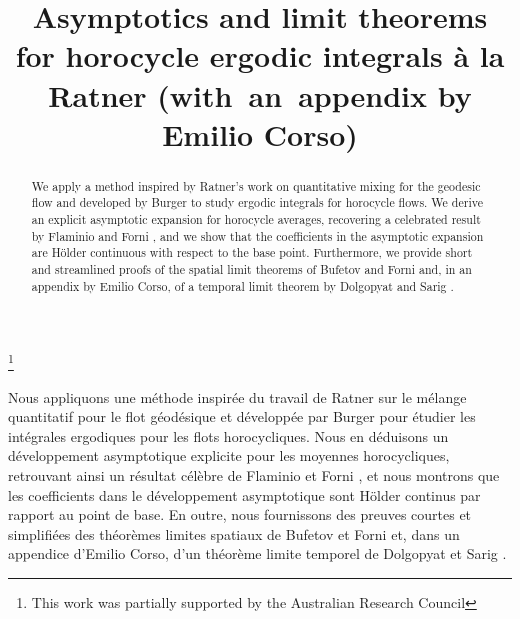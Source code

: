 \documentclass[JEP,XML,SOM,NoEqCountersInSection,Unicode,published]{cedram}
\theoremstyle{definition}
\begin{document}
\title[Asymptotics and limit theorems for horocycle integrals]
{Asymptotics and limit theorems for horocycle ergodic integrals à la Ratner (with~an~appendix by Emilio Corso)}

\author[\initial{D.} \lastname{Ravotti}]{ }
\address{Monash University, School of Mathematics
\\ Clayton Campus, 3800 Victoria, Australia}

\thanks{This work was partially supported by the Australian Research Council}

\begin{abstract}
We apply a method inspired by Ratner's work on quantitative mixing for the \hbox{geodesic} flow \cite{Rat1} and developed by Burger \cite{Bur} to study ergodic integrals for horocycle flows. We derive an explicit asymptotic expansion for horocycle averages, recovering a celebrated result by Flaminio and Forni \cite{FlaFo}, and we show that the coefficients in the asymptotic expansion are Hölder continuous with respect to the base point. Furthermore, we provide short and streamlined proofs of the spatial limit theorems of Bufetov and Forni \cite{BuFo} and, in an appendix by Emilio Corso, of a temporal limit theorem by Dolgopyat and Sarig \cite{Dolgopyat-Sarig}.
\end{abstract}





\begin{altabstract}
Nous appliquons une méthode inspirée du travail de Ratner sur le mélange quantitatif pour le flot géodésique \cite{Rat1} et développée par Burger \cite{Bur} pour étudier les intégrales ergodiques pour les flots horocycliques. Nous en déduisons un développement asymptotique explicite pour les moyennes horocycliques, retrouvant ainsi un résultat célèbre de Flaminio et Forni \cite{FlaFo}, et nous montrons que les coefficients dans le développement asymptotique sont Hölder continus par rapport au point de base. En outre, nous fournissons des preuves courtes et simplifiées des théorèmes limites spatiaux de Bufetov et Forni \cite{BuFo} et, dans un appendice d'Emilio Corso, d'un théorème limite temporel de Dolgopyat et Sarig \cite{Dolgopyat-Sarig}.
\end{altabstract}
\end{document}
